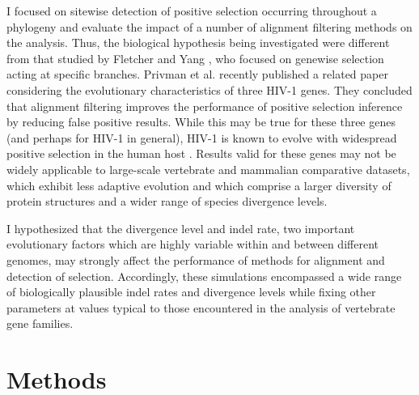 I focused on sitewise detection of positive selection occurring
throughout a phylogeny and evaluate the impact of a number of
alignment filtering methods on the \sw analysis. Thus, the biological
hypothesis being investigated were different from that studied by
Fletcher and Yang \citeyearpar{Fletcher2010}, who focused on
genewise selection acting at specific branches.  Privman et
al. \citeyearpar{Privman2011Improving} recently published a related
paper considering the evolutionary characteristics of three HIV-1
genes. They concluded that alignment filtering improves the
performance of positive selection inference by reducing false positive
results. While this may be true for these three genes (and perhaps for
HIV-1 in general), HIV-1 is known to evolve with widespread positive
selection in the human host \citep{Yang2003Widespread}. Results valid
for these genes may not be widely applicable to large-scale vertebrate
and mammalian comparative datasets, which exhibit less adaptive
evolution \citep{Kosiol2008Patterns} and which comprise a larger
diversity of protein structures and a wider range of species
divergence levels.

I hypothesized that the divergence level and indel rate, two important
evolutionary factors which are highly variable within and between
different genomes, may strongly affect the performance of methods for
alignment and detection of selection. Accordingly, these simulations
encompassed a wide range of biologically plausible indel rates and
divergence levels while fixing other parameters at values typical to
those encountered in the \sw analysis of vertebrate gene families.

\section{Methods}

